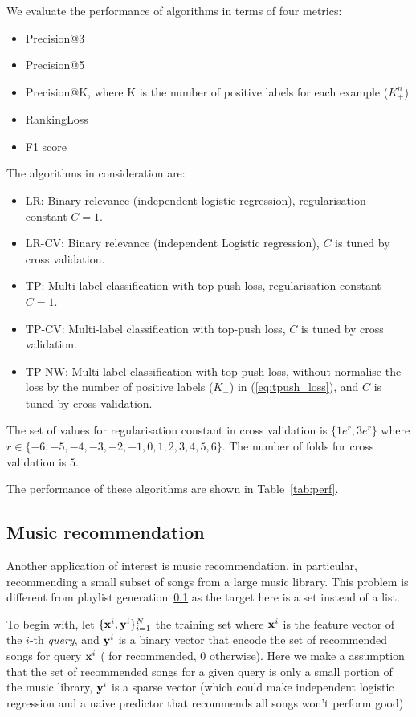 \noindent
We evaluate the performance of algorithms in terms of four metrics:
\begin{itemize}
\item Precision@3
\item Precision@5
\item Precision@K, where K is the number of positive labels for each example (\ie $K_+^n$)
\item RankingLoss
\item F1 score
\end{itemize}

\noindent
The algorithms in consideration are:
\begin{itemize}
\item LR: Binary relevance (\ie independent logistic regression), regularisation constant $C = 1$.
\item LR-CV: Binary relevance (\ie independent Logistic regression), $C$ is tuned by cross validation.
\item TP: Multi-label classification with top-push loss, regularisation constant $C=1$.
\item TP-CV: Multi-label classification with top-push loss, $C$ is tuned by cross validation.
\item TP-NW: Multi-label classification with top-push loss, without normalise the loss by the number of positive labels (\ie $K_+$)
             in (\ref{eq:tpush_loss}), and $C$ is tuned by cross validation.
\end{itemize}
The set of values for regularisation constant in cross validation is 
$\{ 1e^{r}, 3e^{r} \}$ where $r \in \{-6, -5, -4, -3, -2, -1, 0, 1, 2, 3, 4, 5, 6\}$. 
The number of folds for cross validation is $5$.


\noindent
The performance of these algorithms are shown in Table~\ref{tab:perf}.




\subsection{Music recommendation}

Another application of interest is music recommendation, in particular, recommending a small subset of songs from a large music library.
This problem is different from playlist generation~\ref{} as the target here is a set instead of a list.

To begin with, let $\{\mathbf{x}^i, \mathbf{y}^i\}_{i=1}^N$ the training set where $\mathbf{x}^i$ is the feature vector of the $i$-th \emph{query},
and $\mathbf{y}^i$ is a binary vector that encode the set of recommended songs for query $\mathbf{x}^i$ ( for recommended, 0 otherwise).
Here we make a assumption that the set of recommended songs for a given query is only a small portion of the music library,
\ie $\mathbf{y}^i$ is a sparse vector (which could make independent logistic regression and a naive predictor that recommends all songs won't perform good)

